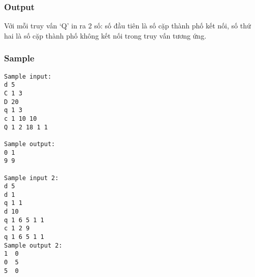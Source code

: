 \subsubsection{Output}

Với mỗi truy vấn ‘Q’ in ra 2 số: số đầu tiên là số cặp thành phố kết nối, số thứ hai là số cặp thành phố không kết nối trong truy vấn tương ứng.

\subsubsection{Sample}
\begin{verbatim}
Sample input: 
d 5 
C 1 3 
D 20 
q 1 3 
c 1 10 10 
Q 1 2 18 1 1 

Sample output: 
0 1 
9 9  

Sample input 2:
d 5
d 1
q 1 1
d 10
q 1 6 5 1 1
c 1 2 9
q 1 6 5 1 1
Sample output 2:
1  0
0  5
5  0
\end{verbatim}

 

 

 